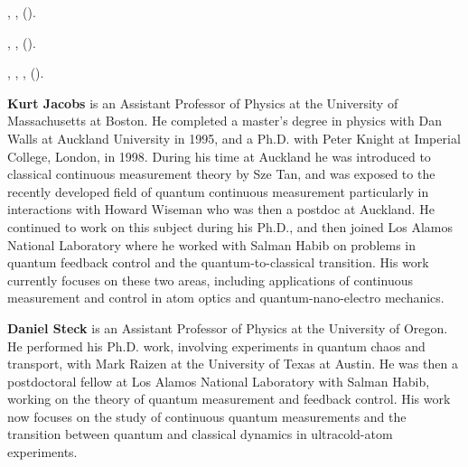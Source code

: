 \documentclass[aps,twocolumn,superscriptaddress,footinbib,floatfix,showpacs]{revtex4}
\begin{document}
\begin{thebibliography}{85}
,
   \textbf{},
   ().

,
   \textbf{},
   ().

,
  ,
   ,
    ().

\end{thebibliography}

\onecolumngrid
\vspace{5mm}
\twocolumngrid  

\noindent
\textbf{Kurt Jacobs} is an Assistant Professor of Physics at the University of
Massachusetts at Boston.  He completed a master's degree in physics
with Dan Walls at Auckland University in 1995, and a Ph.D. with Peter
Knight at Imperial College, London, in 1998.  During his time at
Auckland he was introduced to classical continuous measurement theory
by Sze Tan, and was exposed to the recently developed field of quantum
continuous measurement particularly in interactions with Howard
Wiseman who was then a postdoc at Auckland.  He continued to work on
this subject during his Ph.D., and then joined Los Alamos National
Laboratory where he worked with Salman Habib on problems in quantum
feedback control and the quantum-to-classical transition.  His work
currently focuses on these two areas, including applications of
continuous measurement and control in atom optics and
quantum-nano-electro mechanics.

\noindent
\textbf{Daniel Steck} is an Assistant Professor of Physics at the University of
Oregon.  He performed his Ph.D. work, involving experiments in quantum
chaos and transport, with Mark Raizen at the University of Texas at
Austin.  He was then a postdoctoral fellow at Los Alamos National
Laboratory with Salman Habib, working on the theory of quantum
measurement and feedback control.  His work now focuses on the study
of continuous quantum measurements and the transition between quantum
and classical dynamics in ultracold-atom experiments.
\end{document}
